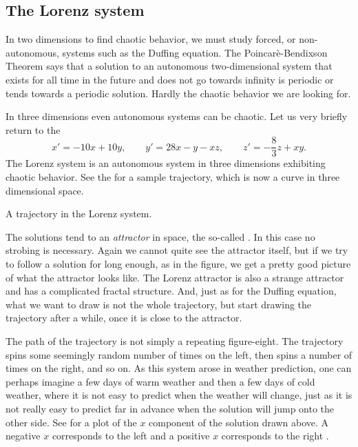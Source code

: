 \subsection{The Lorenz system}

In two dimensions to find chaotic behavior,
we must study forced, or non-autonomous, systems such as the Duffing
equation.
The Poincar\`e-Bendixson Theorem says that
a solution to an autonomous
two-dimensional system that exists for all time in the future
and does not go towards infinity
is periodic or tends towards a periodic solution.  Hardly the chaotic
behavior we are looking for.

In three dimensions even autonomous systems can be chaotic.
Let us very briefly return to the 
\begin{equation*}
x' = -10x +10y, \qquad y' = 28x-y-xz, \qquad z'=-\frac{8}{3}z + xy .
\end{equation*}
The Lorenz system is an autonomous system in three dimensions
exhibiting chaotic behavior.
See the  for a sample trajectory,
which is now a curve in three dimensional space.
\begin{myfig}
\capstart
{}
\caption{A trajectory in the Lorenz system. \label{nlin:lorenz}}
\end{myfig}

The solutions tend to an \emph{attractor} in space,
the so-called \emph{}.
In this case no strobing is
necessary.
Again we cannot quite see the attractor itself, but if we try to follow a solution
for long enough, as in the figure,
we get a pretty good picture of what the attractor looks
like.
The Lorenz attractor is also a strange attractor and has a complicated
fractal structure.  And, just as for the Duffing equation, what we want to
draw is not the whole trajectory, but start drawing the trajectory after a
while, once it is close to the attractor.

The path of the trajectory is not simply a repeating figure-eight.
The trajectory spins some
seemingly random number of times on the left, then spins a number of times on
the right, and so on.  As this system arose in weather prediction, one can
perhaps imagine a few days of warm weather and then a few days of cold
weather, where it is not easy to predict when the weather will change,
just as it is not really easy to predict far in advance when the solution
will jump onto the other side.  See  for a
plot of the $x$ component of the solution drawn above.  A negative $x$
corresponds to the left  and a positive $x$
corresponds to the right .

